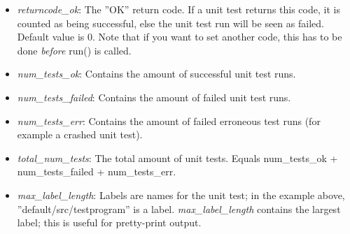 \documentclass[a4paper,10pt]{article}
\begin{document}
\begin{itemize}
	\item \emph{returncode\_ok}: The ''OK'' return code. If a unit test returns this code, it is counted as being successful, else the unit test run will be seen as failed. Default value is 0. Note that if you want to set another code, this has to be done \emph{before} run() is called.
	\item \emph{num\_tests\_ok}: Contains the amount of successful unit test runs.
	\item \emph{num\_tests\_failed}:  Contains the amount of failed unit test runs.
	\item \emph{num\_tests\_err}: Contains the amount of failed erroneous test runs (for example a crashed unit test).
	\item \emph{total\_num\_tests}: The total amount of unit tests. Equals num\_tests\_ok + num\_tests\_failed + num\_tests\_err.
	\item \emph{max\_label\_length}: Labels are names for the unit test; in the example above, ''default/src/testprogram'' is a label. \emph{max\_label\_length} contains the largest label; this is useful for pretty-print output.
\end{itemize}
\end{document}
